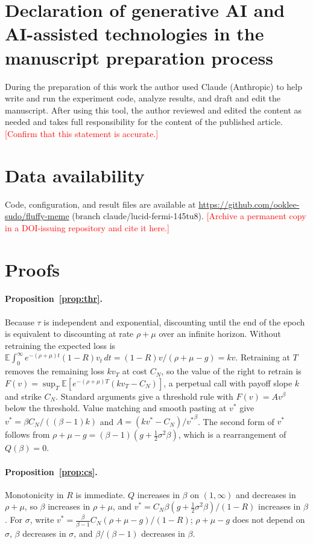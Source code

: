 \documentclass[preprint,12pt,authoryear]{elsarticle}
\newcommand{\todo}[1]{\textcolor{red}{[#1]}}
\newcommand{\E}{\mathbb{E}}
\begin{document}
\section*{Declaration of generative AI and AI-assisted technologies in the manuscript preparation process}
During the preparation of this work the author used Claude (Anthropic) to help write and run the experiment code, analyze results, and draft and edit the manuscript. After using this tool, the author reviewed and edited the content as needed and takes full responsibility for the content of the published article. \todo{Confirm that this statement is accurate.}

\section*{Data availability}
Code, configuration, and result files are available at \url{https://github.com/ooklee-sudo/fluffy-meme} (branch claude/lucid-fermi-145tu8). \todo{Archive a permanent copy in a DOI-issuing repository and cite it here.}

\appendix


\section{Proofs}\label{app:proofs}

\paragraph{Proposition~\ref{prop:thr}.} Because $\tau$ is independent and exponential, discounting until the end of the epoch is equivalent to discounting at rate $\rho+\mu$ over an infinite horizon. Without retraining the expected loss is $\E\int_0^\infty e^{-(\rho+\mu)t}(1-R)v_t\,dt=(1-R)v/(\rho+\mu-g)=kv$. Retraining at $T$ removes the remaining loss $kv_T$ at cost $C_N$, so the value of the right to retrain is $F(v)=\sup_T\E[e^{-(\rho+\mu)T}(kv_T-C_N)]$, a perpetual call with payoff slope $k$ and strike $C_N$. Standard arguments \citep{dixit1994investment} give a threshold rule with $F(v)=Av^\beta$ below the threshold. Value matching and smooth pasting at $v^*$ give $v^*=\beta C_N/((\beta-1)k)$ and $A=(kv^*-C_N)/{v^*}^\beta$. The second form of $v^*$ follows from $\rho+\mu-g=(\beta-1)(g+\tfrac12\sigma^2\beta)$, which is a rearrangement of $Q(\beta)=0$.

\paragraph{Proposition~\ref{prop:cs}.} Monotonicity in $R$ is immediate. $Q$ increases in $\beta$ on $(1,\infty)$ and decreases in $\rho+\mu$, so $\beta$ increases in $\rho+\mu$, and $v^*=C_N\beta(g+\tfrac12\sigma^2\beta)/(1-R)$ increases in $\beta$. For $\sigma$, write $v^*=\frac{\beta}{\beta-1}C_N(\rho+\mu-g)/(1-R)$; $\rho+\mu-g$ does not depend on $\sigma$, $\beta$ decreases in $\sigma$, and $\beta/(\beta-1)$ decreases in $\beta$.
\end{document}
